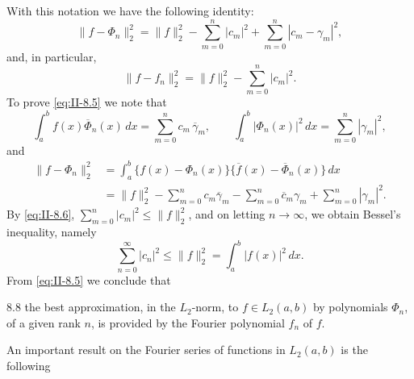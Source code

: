 With this notation we have the following identity:
\begin{equation}\tag{8.5}\label{eq:II-8.5}
\|f-\Phi_{n}\|_{2}^{2}
=\|f\|_{2}^{2}-\sum_{m=0}^{n}|c_{m}|^{2}
+\sum_{m=0}^{n}|c_{m}-\gamma_{m}|^{2},
\end{equation}
and, in particular,
\begin{equation}\tag{8.6}\label{eq:II-8.6}
\|f-f_{n}\|_{2}^{2}=\|f\|_{2}^{2}-\sum_{m=0}^{n}|c_{m}|^{2}.
\end{equation}
To prove \eqref{eq:II-8.5} we note that
\[
\int_{a}^{b}f(x)\overline{\Phi}_{n}(x)\,dx
=\sum_{m=0}^{n}c_{m}\,\overline{\gamma}_{m},\qquad
\int_{a}^{b}|\Phi_{n}(x)|^{2}\,dx
=\sum_{m=0}^{n}|\gamma_{m}|^{2},
\]
and
\[
\begin{aligned}
\|f-\Phi_{n}\|_{2}^{2} &= \int_{a}^{b}\bigl\{f(x)-\Phi_{n}(x)\bigr\}\bigl\{\overline{f}(x)-\overline{\Phi}_{n}(x)\bigr\}\,dx\\
&= \|f\|_{2}^{2}-\sum_{m=0}^{n}c_{m}\overline{\gamma}_{m}
-\sum_{m=0}^{n}\overline{c}_{m}\gamma_{m}
+\sum_{m=0}^{n}|\gamma_{m}|^{2}.
\end{aligned}
\]
By \eqref{eq:II-8.6}, $\sum_{m=0}^{n}|c_{m}|^{2}\le\|f\|_{2}^{2}$, and on letting $n\to\infty$, we obtain Bessel's inequality, namely
\begin{equation}\tag{8.7}\label{eq:II-8.7}
\sum_{n=0}^{\infty}|c_{n}|^{2}\le\|f\|_{2}^{2}
=\int_{a}^{b}|f(x)|^{2}\,dx.
\end{equation}
From \eqref{eq:II-8.5} we conclude that
\begin{nstmt}{8.8}\label{eq:II-8.8}
the best approximation, in the $L_{2}$-norm, to $f\in L_{2}(a,b)$ by polynomials $\Phi_{n}$, of a given rank $n$, is provided by the Fourier polynomial $f_{n}$ of $f$.
\end{nstmt}

An important result on the Fourier series of functions in $L_{2}(a,b)$ is the following

